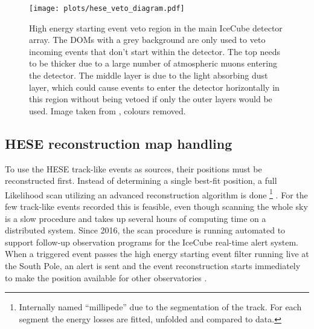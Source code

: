 \begin{figure}[htbp]
  \centering
  \texttt{[image: plots/hese\_veto\_diagram.pdf]}
  \caption[High energy starting event veto region]{
    High energy starting event veto region in the main IceCube detector array.
    The  DOMs with a grey background are only used to veto incoming events that don't start within the detector.
    The top needs to be thicker due to a large number of atmospheric muons entering the detector.
    The middle layer is due to the light absorbing dust layer, which could cause events to enter the detector horizontally in this region without being vetoed if only the outer layers would be used.
    Image taken from \cite{Aartsen:2013jdh}, colours removed.
  }
  \label{fig:data_hese_veto}
\end{figure}

\subsection{HESE reconstruction map handling}
To use the HESE track-like events as sources, their positions must be reconstructed first.
Instead of determining a single best-fit position, a full Likelihood scan utilizing an advanced reconstruction algorithm is done \footnote{Internally named \enquote{millipede} due to the segmentation of the track. For each segment the energy losses are fitted, unfolded and compared to data.} \cite{Aartsen:2013vja}.
For the few track-like events recorded this is feasible, even though scanning the whole sky is a slow procedure and takes up several hours of computing time on a distributed system.
Since 2016, the scan procedure is running automated to support follow-up observation programs for the IceCube real-time alert system.
When a triggered event passes the high energy starting event filter running live at the South Pole, an alert is sent and the event reconstruction starts immediately to make the position available for other observatories \cite{Aartsen:2016lmt}.

